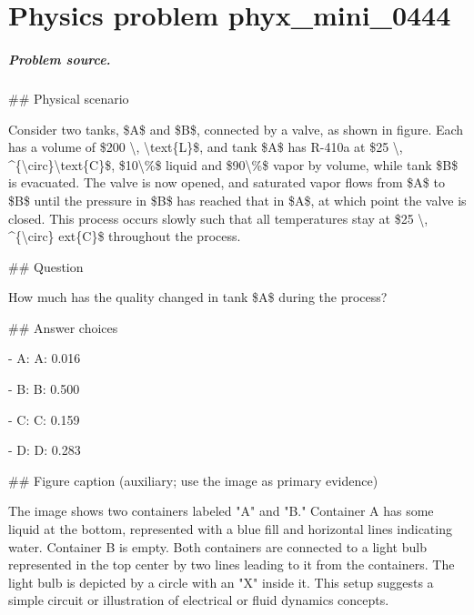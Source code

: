 
\chapter{Physics problem phyx\_mini\_0444}
\label{ch:PhyXMiniProblems_problem_phyx_mini_0444}

\paragraph{Problem source.}
\#\# Physical scenario

Consider two tanks, \$A\$ and \$B\$, connected by a valve, as shown in figure. Each has a volume of \$200 \textbackslash{}, \textbackslash{}text\{L\}\$, and tank \$A\$ has R-410a at \$25 \textbackslash{}, \textasciicircum{}\{\textbackslash{}circ\}\textbackslash{}text\{C\}\$, \$10\textbackslash{}\%\$ liquid and \$90\textbackslash{}\%\$ vapor by volume, while tank \$B\$ is evacuated. The valve is now opened, and saturated vapor flows from \$A\$ to \$B\$ until the pressure in \$B\$ has reached that in \$A\$, at which point the valve is closed. This process occurs slowly such that all temperatures stay at \$25 \textbackslash{}, \textasciicircum{}\{\textbackslash{}circ\}	ext\{C\}\$ throughout the process.

\#\# Question

How much has the quality changed in tank \$A\$ during the process?

\#\# Answer choices

- A: A: 0.016

- B: B: 0.500

- C: C: 0.159

- D: D: 0.283

\#\# Figure caption (auxiliary; use the image as primary evidence)

The image shows two containers labeled "A" and "B." Container A has some liquid at the bottom, represented with a blue fill and horizontal lines indicating water. Container B is empty. Both containers are connected to a light bulb represented in the top center by two lines leading to it from the containers. The light bulb is depicted by a circle with an "X" inside it. This setup suggests a simple circuit or illustration of electrical or fluid dynamics concepts.

